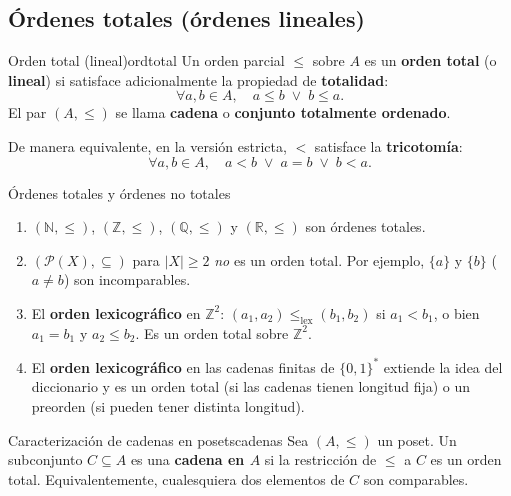 \subsection{Órdenes totales (órdenes lineales)}

\begin{definicion}{Orden total (lineal)}{ordtotal}
Un orden parcial $\leq$ sobre $A$ es un \textbf{orden total} (o \textbf{lineal}) si satisface adicionalmente la propiedad de \textbf{totalidad}:
\[
  \forall a,b \in A,\quad a \leq b \;\vee\; b \leq a.
\]
El par $(A, \leq)$ se llama \textbf{cadena} o \textbf{conjunto totalmente ordenado}.

De manera equivalente, en la versión estricta, $<$ satisface la \textbf{tricotomía}:
\[
  \forall a,b \in A,\quad a < b \;\vee\; a = b \;\vee\; b < a.
\]
\end{definicion}

\begin{ejemplo}{Órdenes totales y órdenes no totales}{}
\begin{enumerate}[leftmargin=2em, label=(\alph*)]
  \item $(\mathbb{N}, \leq)$, $(\mathbb{Z}, \leq)$, $(\mathbb{Q}, \leq)$ y $(\mathbb{R}, \leq)$ son órdenes totales.

  \item $(\mathcal{P}(X), \subseteq)$ para $|X| \geq 2$ \emph{no} es un orden total. Por ejemplo, $\{a\}$ y $\{b\}$ ($a \neq b$) son incomparables.

  \item El \textbf{orden lexicográfico} en $\mathbb{Z}^2$: $(a_1, a_2) \leq_{\mathrm{lex}} (b_1, b_2)$ si $a_1 < b_1$, o bien $a_1 = b_1$ y $a_2 \leq b_2$. Es un orden total sobre $\mathbb{Z}^2$.

  \item El \textbf{orden lexicográfico} en las cadenas finitas de $\{0,1\}^*$ extiende la idea del diccionario y es un orden total (si las cadenas tienen longitud fija) o un preorden (si pueden tener distinta longitud).
\end{enumerate}
\end{ejemplo}

\begin{proposicion}{Caracterización de cadenas en posets}{cadenas}
Sea $(A, \leq)$ un poset. Un subconjunto $C \subseteq A$ es una \textbf{cadena en $A$} si la restricción de $\leq$ a $C$ es un orden total. Equivalentemente, cualesquiera dos elementos de $C$ son comparables.
\end{proposicion}

